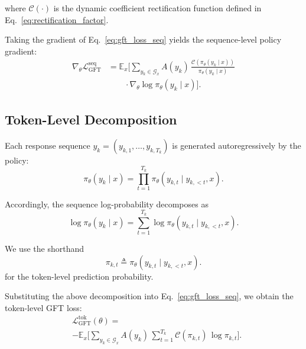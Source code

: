 where \(\mathcal{C}(\cdot)\) is the dynamic coefficient rectification function defined
in Eq.~\eqref{eq:rectification_factor}.

Taking the gradient of Eq.~\eqref{eq:gft_loss_seq} yields the sequence-level policy gradient:
\begin{equation}
\begin{split}
\nabla_\theta \mathcal{L}_{\mathrm{GFT}}^{\mathrm{seq}}
&= 
\mathbb{E}_{x}
\Bigg[
\sum_{y_k \in \mathcal{G}_x}
A(y_k)\,
\frac{\mathcal{C}\left(\pi_\theta(y_k \mid x)\right)}{\pi_\theta(y_k \mid x)}
\\
&\qquad\cdot 
\nabla_\theta \log \pi_\theta(y_k \mid x)
\Bigg].
\end{split}
\label{eq:gft_grad_seq}
\end{equation}

\subsection{Token-Level Decomposition}
\label{subsec:token_level_decomp}

Each response sequence \(y_k = (y_{k,1}, \ldots, y_{k,T_k})\) is generated autoregressively by the policy:
\begin{equation}
\pi_\theta(y_k \mid x)
=
\prod_{t=1}^{T_k}
\pi_\theta\!\left(y_{k,t} \mid y_{k,<t}, x\right).
\end{equation}

Accordingly, the sequence log-probability decomposes as
\begin{equation}
\log \pi_\theta(y_k \mid x)
=
\sum_{t=1}^{T_k}
\log \pi_\theta\!\left(y_{k,t} \mid y_{k,<t}, x\right).
\end{equation}

We use the shorthand
\begin{equation}
\pi_{k,t}
\triangleq
\pi_\theta\!\left(y_{k,t} \mid y_{k,<t}, x\right).
\label{eq:pi_kt_def}
\end{equation}
for the token-level prediction probability.

Substituting the above decomposition into Eq.~\eqref{eq:gft_loss_seq}, we obtain the token-level GFT loss:
\begin{equation}
\begin{split}
& \mathcal{L}_{\mathrm{GFT}}^{\mathrm{tok}}(\theta)
= %
\\
& - %
\mathbb{E}_{x}
\Bigg[
\sum_{y_k \in \mathcal{G}_x}
A(y_k)\,
\sum_{t=1}^{T_k}
\mathcal{C}(\pi_{k,t})\,
\log \pi_{k,t}
\Bigg].
\end{split}
\label{eq:gft_loss_tok}
\end{equation}

